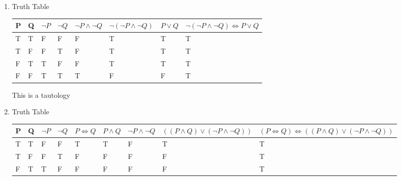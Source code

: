 \documentclass[english]{article}
\begin{document}
\begin{enumerate} [label=\alph*]
This is a tautology
\item Truth Table
\begin{table} [!h]
    \begin{tabular}{|l|l|l|l|l|l|l|l|}
        \hline
        P & Q & $\lnot P$ & $\lnot Q$ & $\lnot P \land \lnot Q$ & $\lnot (\lnot P \land \lnot Q)$ & $ P \lor Q$ & $\lnot (\lnot P \land \lnot Q)\iff P \lor Q$ \\ \hline
        T & T & F         & F         & F                       & T                               & T           & T                                            \\ 
        T & F & F         & T         & F                       & T                               & T           & T                                            \\ 
        F & T & T         & F         & F                       & T                               & T           & T                                            \\ 
        F & F & T         & T         & T                       & F                               & F           & T                                            \\
        \hline
    \end{tabular}
\end{table}
This is a tautology
\item Truth Table
\begin{table} [!h]
    \begin{tabular}{|l|l|l|l|l|l|l|l|l|}
        \hline
        P & Q & $\lnot P$ & $\lnot Q$ & $P \iff Q$ & $ P \land Q $ & $ \lnot P \land \lnot Q$ & $(( P \land Q ) \lor (\lnot P \land \lnot Q))$ & $ (P \iff Q ) \iff (( P \land Q ) \lor (\lnot P \land \lnot Q)) $ \\ \hline
        T & T & F         & F         & T          & T             & F                        & T                                              & T                                                                 \\ 
        T & F & F         & T         & F          & F             & F                        & F                                              & T                                                                 \\ 
        F & T & T         & F         & F          & F             & F                        & F                                              & T                                                                 \\ 

\end{tabular}
\end{table}
\end{enumerate}
\end{document}
